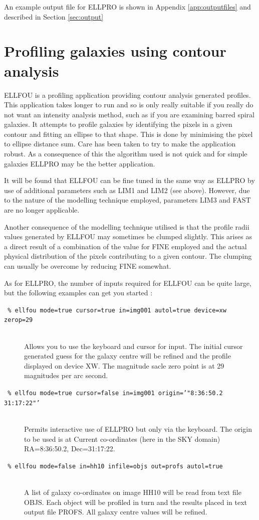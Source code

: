 \documentclass[twoside,11pt]{article}
\newcommand{\xlabel}[1]{}
\begin{document}
An example output file for ELLPRO is shown in Appendix \ref{app:outputfiles}
and described in Section \ref{sec:output}

\section{Profiling galaxies using contour analysis}
\xlabel{ELLFOU}
\label{sec:profc}

ELLFOU is a profiling application providing contour analysis generated profiles.
This application takes longer to run and so is only really suitable if you
really do not want an intensity analysis method, such as if you are
examining barred spiral galaxies. It attempts to profile galaxies by identifying 
the pixels in a given contour and fitting an ellipse to that shape. This is 
done by minimising the pixel to ellipse distance sum. Care has been taken 
to try to make the application robust. As a consequence of this the algorithm 
used is not quick and for simple galaxies ELLPRO may be the better application.

It will be found that ELLFOU can be fine tuned in the same way as ELLPRO 
by use of additional parameters such as LIM1 and LIM2 (see above). However, 
due to the nature of the modelling technique employed, parameters LIM3 
and FAST are no longer applicable. 

Another consequence of the modelling technique utilised is that the profile 
radii values generated by ELLFOU may sometimes be clumped slightly. 
This arises as a direct result of a combination of the value for FINE 
employed and the actual physical distribution of the pixels contributing
to a given contour. The clumping can usually be overcome by reducing FINE 
somewhat.

As for ELLPRO, the number of inputs required for ELLFOU can be quite large, 
but the following examples can get you started :

\begin{description}
\item[{\tt
   \% ellfou mode=true cursor=true in=img001 autol=true device=xw zerop=29}]
   \mbox{}\\
  Allows you to use the keyboard and cursor for input. The initial cursor 
  generated guess for the galaxy centre will be refined and the profile 
  displayed on device XW.  The magnitude sacle zero point is at 29 
  magnitudes per arc second.
\item[{\tt
   \% ellfou mode=true cursor=false in=img001 origin='"8:36:50.2 31:17:22"'}]
  \mbox{}\\
  Permits interactive use of ELLPRO but only via the keyboard. The origin 
  to be used is at Current co-ordinates (here in the SKY domain) 
  RA=8:36:50.2, Dec=31:17:22.
\item[{\tt
   \% ellfou mode=false in=hh10 infile=objs out=profs autol=true}]
   \mbox{}\\
  A list of galaxy co-ordinates on image HH10 will be read from text 
  file OBJS. Each object will be profiled in turn and the results placed in 
  text output file PROFS. All galaxy centre values will be refined.
\end{description}
\end{document}
